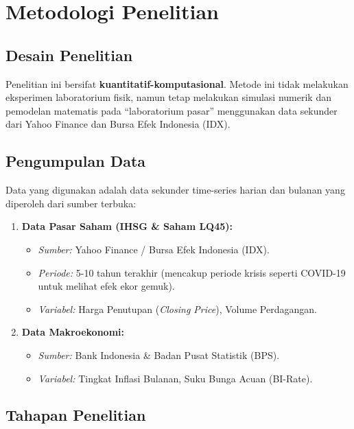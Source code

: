 \section{Metodologi Penelitian}

\subsection{Desain Penelitian}
Penelitian ini bersifat \textbf{kuantitatif-komputasional}. Metode ini tidak melakukan eksperimen laboratorium fisik, namun tetap melakukan simulasi numerik dan pemodelan matematis pada ``laboratorium pasar'' menggunakan data sekunder dari Yahoo Finance dan Bursa Efek Indonesia (IDX).

\subsection{Pengumpulan Data}
Data yang digunakan adalah data sekunder time-series harian dan bulanan yang diperoleh dari sumber terbuka:
\begin{enumerate}
    \item \textbf{Data Pasar Saham (IHSG \& Saham LQ45):}
    \begin{itemize}
        \item \textit{Sumber:} Yahoo Finance / Bursa Efek Indonesia (IDX).
        \item \textit{Periode:} 5-10 tahun terakhir (mencakup periode krisis seperti COVID-19 untuk melihat efek ekor gemuk).
        \item \textit{Variabel:} Harga Penutupan (\textit{Closing Price}), Volume Perdagangan.
    \end{itemize}
    \item \textbf{Data Makroekonomi:}
    \begin{itemize}
        \item \textit{Sumber:} Bank Indonesia \& Badan Pusat Statistik (BPS).
        \item \textit{Variabel:} Tingkat Inflasi Bulanan, Suku Bunga Acuan (BI-Rate).
    \end{itemize}
\end{enumerate}

\subsection{Tahapan Penelitian}

